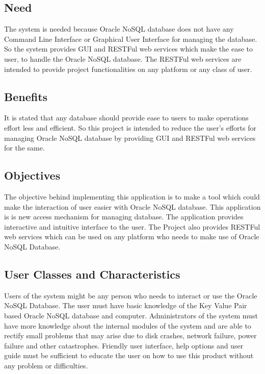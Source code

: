 \subsection{Need}
\hspace*{0.7in} The system is needed because Oracle NoSQL database does not have any Command Line Interface or Graphical User Interface for managing the database. So the system provides GUI and RESTFul web services which make the ease to user, to handle the Oracle NoSQL database. The RESTFul web services are intended to provide project functionalities on any platform or any class of user.

\subsection{Benefits}
\hspace*{0.7in} It is stated that any database should provide ease to users to make operations effort less and efficient. So this project is intended to reduce the user's efforts for managing Oracle NoSQL database by providing GUI and RESTFul web services for the same.
\subsection{Objectives}
\hspace*{0.7in} The objective behind implementing this application is to make a tool which could make the interaction of user easier with Oracle NoSQL database. This application is is new access mechanism for managing database. The application provides interactive and intuitive interface to the user. The Project also provides RESTFul web services which can be used on any platform who needs to make use of Oracle NoSQL Database.

\subsection{User Classes and Characteristics}
\hspace*{0.7in} Users of the system might be any person who needs to interact or use the Oracle NoSQL Database. The user must have basic knowledge of the Key Value Pair based Oracle NoSQL database and computer. Administrators of the system must have more knowledge about the internal modules of the system and are able to rectify small problems that may arise due to disk crashes, network failure, power failure and other catastrophes. Friendly user interface, help options and user guide must be sufficient to educate the user on how to use this product without any problem or difficulties.

